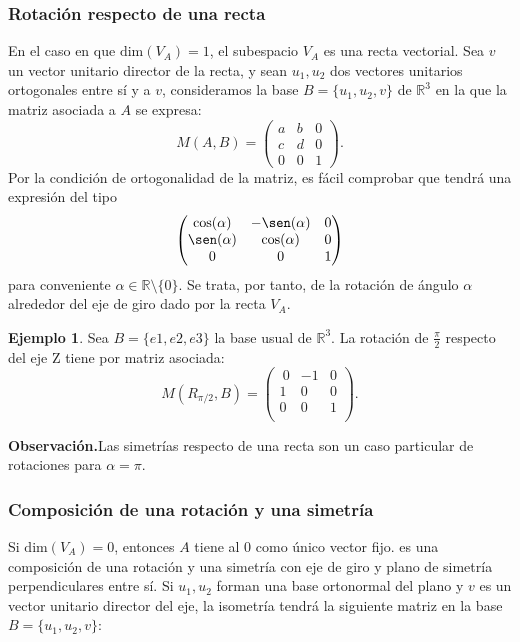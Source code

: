 \documentclass[11pt]{article}
\theoremstyle{definition}
\newtheorem{ejemplo}{Ejemplo}[section]
\begin{document}
\subsubsection{Rotación respecto de una recta}
En el caso en que $\mathrm{dim}(V_A)=1$, el subespacio $V_A$ es una recta vectorial. Sea $v$ un vector unitario director de la recta, y sean $u_1,u_2$ dos vectores unitarios ortogonales entre sí y a $v$, consideramos la base $B=\{u_1,u_2,v\}$ de $\mathbb R^3$ en la que la matriz asociada a $A$ se expresa:
    \[M(A, B)=\begin{pmatrix}a&b&0\\c&d&0\\0&0&1\end{pmatrix}.\]
Por la condición de ortogonalidad de la matriz, es fácil comprobar que tendrá una expresión del tipo
    \[\begin{pmatrix}\cos(\alpha)&-\sen(\alpha)&0\\\sen(\alpha)&\cos(\alpha)&0\\0&0&1\end{pmatrix}\]
    para conveniente $\alpha\in \mathbb R\setminus\{0\}$. Se trata, por tanto, de la rotación de ángulo $\alpha$ alrededor del eje de giro dado por la recta $V_A$.


\begin{ejemplo}
Sea $B=\{e1 , e2 , e3\}$ la base usual de  $\mathbb{R}^3$. La rotación de $\frac\pi 2$ respecto del eje Z tiene por matriz asociada:
\[M(R_{\pi/2},B)=
    \begin{pmatrix}
    \ 0 & -1 & 0 \\ 1 & 0 & 0 \\ 0 & 0 & 1 \\
    \end{pmatrix}.
  \]
\end{ejemplo}

\noindent\textbf{Observación.}\quad Las simetrías respecto de una recta son un caso particular de rotaciones para $\alpha=\pi$.
    \\

\subsubsection{Composición de una rotación y una simetría}

Si $\mathrm{dim}(V_A)=0$, entonces $A$ tiene al $0$ como único vector fijo. es una composición de una rotación y una simetría con eje de giro y plano de simetría perpendiculares entre sí. Si $u_1, u_2$ forman una base ortonormal del plano y $v$ es un vector unitario director del eje, la isometría tendrá la siguiente matriz en la base $B=\{u_1,u_2,v\}$:
\end{document}
